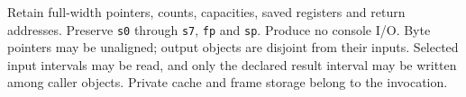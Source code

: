 Retain full-width pointers, counts, capacities, saved registers and return addresses.
Preserve \texttt{s0} through \texttt{s7}, \texttt{fp} and \texttt{sp}. Produce no console
I/O. Byte pointers may be unaligned; output objects are disjoint from their inputs.
Selected input intervals may be read, and only the declared result interval may be
written among caller objects. Private cache and frame storage belong to the invocation.
